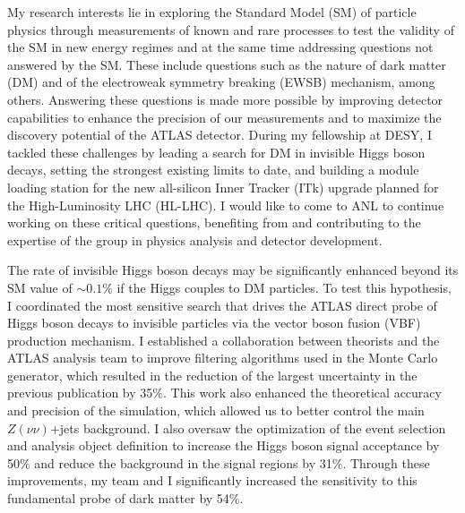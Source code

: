 \documentclass[a4paper]{article}
\begin{document}
\thispagestyle{fancy} 
 \lfoot{} \rfoot{\bf \thepage} \cfoot{}

\fontsize{11}{14}
\selectfont


My research interests lie in exploring the Standard Model (SM) of particle physics through measurements of known and rare processes
to test the validity of the SM in new energy regimes and at the same time addressing questions not answered by the SM.
These include questions such as the nature of dark matter (DM) and of the electroweak symmetry breaking (EWSB) mechanism, among others.
Answering these questions is made more possible by improving detector capabilities to enhance the precision of our measurements and to maximize the discovery potential of the ATLAS detector.
During my fellowship at DESY, I tackled these challenges by leading a search for DM in invisible Higgs boson decays, setting the strongest existing limits to date, and building a module loading station for the new all-silicon Inner Tracker (ITk) upgrade planned for the High-Luminosity LHC (HL-LHC). I would like to come to ANL to continue working on these critical questions, benefiting from and contributing to the expertise of the group in physics analysis and detector development.



The rate of invisible Higgs boson decays may be significantly enhanced beyond its SM value of $\sim0.1\%$ if the Higgs couples to DM particles.
To test this hypothesis, I coordinated the most sensitive search that drives the ATLAS direct probe of Higgs boson decays to invisible particles via the vector boson fusion (VBF) production mechanism. I established a collaboration between theorists and the ATLAS analysis team to improve
filtering algorithms used in the Monte Carlo generator, which resulted in the reduction of the largest uncertainty in the previous publication by 35\%. This work also enhanced the theoretical accuracy and precision of the simulation, which allowed us to better control the main $Z\left(\nu\nu\right)$+jets background.
I also oversaw the optimization of the event selection and analysis object definition to increase the Higgs boson signal acceptance by 50\% and reduce the background in the signal regions by 31\%. Through these improvements, my team and I significantly increased the sensitivity to this fundamental probe of dark matter by 54\%.
\end{document}
